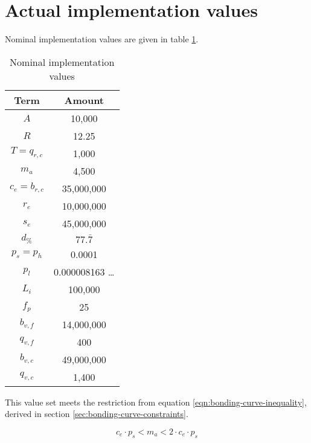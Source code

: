 \documentclass[table, twocolumn]{article}
\begin{document}
\section{Actual implementation values}

Nominal implementation values are given in table
\ref{tab:nominal-implementation-values}.

\begin{table}[!htb]
  \centering
  \begin{tabular}{|c|c|}
    \hline \rowcolor{blue}
    Term             & Amount             \\ \hline
    $A$              & 10,000             \\ \hline
    $R$              & 12.25              \\ \hline
    $T = q_{r ,c}$   & 1,000              \\ \hline
    $m_a$            & 4,500              \\ \hline
    $c_e = b_{r, c}$ & 35,000,000         \\ \hline
    $r_e$            & 10,000,000         \\ \hline
    $s_e$            & 45,000,000         \\ \hline
    \rule{0pt}{10pt} %
    $d_\%$           & $77.\bar{7}$       \\ \hline
    $p_s = p_h$      & 0.0001             \\ \hline
    $p_l$            & 0.000008163 \ldots \\ \hline
    $L_i$            & 100,000            \\ \hline
    $f_p$            & 25                 \\ \hline
    $b_{v, f}$       & 14,000,000         \\ \hline
    $q_{v, f}$       & 400                \\ \hline
    $b_{v, c}$       & 49,000,000         \\ \hline
    $q_{v, c}$       & 1,400              \\ \hline
  \end{tabular}
  \caption{Nominal implementation values}
  \label{tab:nominal-implementation-values}
\end{table}

This value set meets the restriction from equation \ref{eqn:bonding-curve-inequality},
derived in section \ref{sec:bonding-curve-constraints}.

\begin{equation} \label{eqn:bonding-curve-inequality}
  c_e \cdot p_s < m_a < 2 \cdot c_e \cdot p_s
\end{equation}
\end{document}

